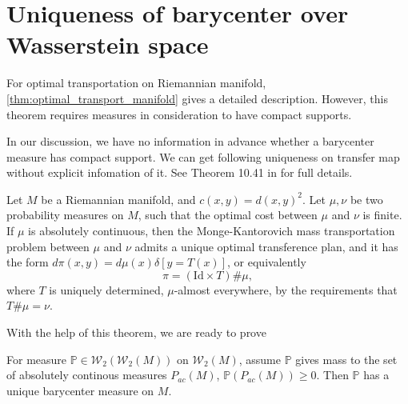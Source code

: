 \section{Uniqueness of barycenter over Wasserstein space}

For optimal transportation on Riemannian manifold,
\cref{thm:optimal_transport_manifold} gives a detailed description.
However, this theorem requires measures in consideration to have compact supports.

In our discussion,
we have no information in advance
whether a barycenter measure has compact support.
We can get following uniqueness on transfer map
without explicit infomation of it.
See Theorem 10.41 in \cite{villani2008optimal} for full details.
\begin{thm}
	\label{thm:uniquness_monge_problem_manifold}
	Let \( M \) be a Riemannian manifold, and \( c ( x , y ) = d ( x , y ) ^ { 2 } \).
	Let \( \mu , \nu \) be two probability measures on \( M \), such that the optimal cost
	between \( \mu \) and \( \nu \) is finite. If \( \mu \) is absolutely continuous,
	then the Monge-Kantorovich mass transportation
	problem between \( \mu \) and \( \nu \) admits a unique optimal transference plan, and it
	has the form \( d \pi ( x , y ) = d \mu ( x ) \delta [ y = T ( x ) ] \), or equivalently
	\[ \pi = ( \mathrm { Id } \times T ) \# \mu , \]
	where \( T \) is uniquely determined, \( \mu \)-almost everywhere, by the requirements
	that \( T \# \mu = \nu \).
\end{thm}

With the help of this theorem, we are ready to prove
\begin{prop}
	For measure $\mathbb{P} \in \mathcal{W}_2(\mathcal{W}_2(M))$ on $\mathcal{W}_2(M)$,
	assume $\mathbb{P}$ gives mass to the set of absolutely continous measures $P_{ac}(M)$, $\mathbb{P}(P_{ac}(M)) \geq 0 $.
	Then $\mathbb{P}$ has a unique barycenter measure on $M$.
\end{prop}

